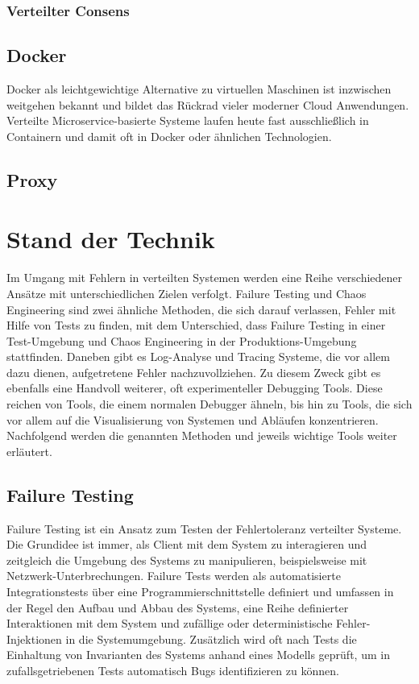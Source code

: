 \documentclass[12pt,a4paper]{report}
\begin{document}
\subsection{Verteilter Consens}
\section{Docker}
Docker als leichtgewichtige Alternative zu virtuellen Maschinen ist inzwischen weitgehen bekannt und bildet das Rückrad vieler
moderner Cloud Anwendungen. Verteilte Microservice-basierte Systeme laufen heute fast ausschließlich in Containern und damit oft
in Docker oder ähnlichen Technologien.
\section{Proxy}

\chapter{Stand der Technik}
Im Umgang mit Fehlern in verteilten Systemen werden eine Reihe verschiedener Ansätze mit unterschiedlichen Zielen verfolgt.
Failure Testing und Chaos Engineering sind zwei ähnliche Methoden, die sich darauf verlassen, Fehler mit Hilfe von Tests zu
finden, mit dem Unterschied, dass Failure Testing in einer Test-Umgebung und Chaos Engineering in der Produktions-Umgebung
stattfinden. Daneben gibt es Log-Analyse und Tracing Systeme, die vor allem dazu dienen, aufgetretene Fehler nachzuvollziehen. Zu
diesem Zweck gibt es ebenfalls eine Handvoll weiterer, oft experimenteller Debugging Tools. Diese reichen von Tools, die einem
normalen Debugger ähneln, bis hin zu Tools, die sich vor allem auf die Visualisierung von Systemen und Abläufen konzentrieren.
Nachfolgend werden die genannten Methoden und jeweils wichtige Tools weiter erläutert.
\cite{challenges_and_options}

\section{Failure Testing}
Failure Testing ist ein Ansatz zum Testen der Fehlertoleranz verteilter Systeme. Die Grundidee ist immer, als Client mit dem
System zu interagieren und zeitgleich die Umgebung des Systems zu manipulieren, beispielsweise mit Netzwerk-Unterbrechungen.
Failure Tests werden als automatisierte Integrationstests über eine Programmierschnittstelle definiert und umfassen in der Regel den Aufbau
und Abbau des Systems, eine Reihe definierter Interaktionen mit dem System und zufällige oder deterministische Fehler-Injektionen
in die Systemumgebung. Zusätzlich wird oft nach Tests die Einhaltung von Invarianten des Systems anhand eines Modells geprüft, um
in zufallsgetriebenen Tests automatisch Bugs identifizieren zu können. \cite{failify_masters_thesis}
\end{document}
